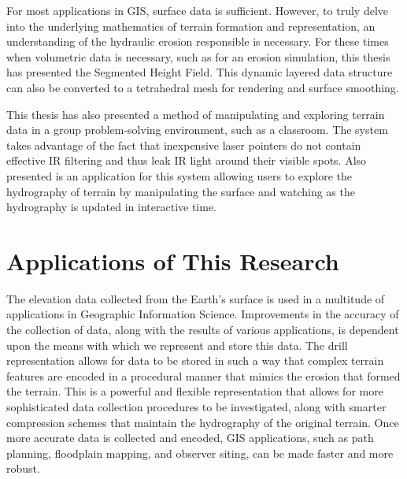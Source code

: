 For most applications in GIS, surface data is sufficient. However, to truly delve into the underlying mathematics of terrain formation and representation, an understanding of the hydraulic erosion responsible is necessary. For these times when volumetric data is necessary, such as for an erosion simulation, this thesis has presented the Segmented Height Field. This dynamic layered data structure can also be converted to a tetrahedral mesh for rendering and surface smoothing.

This thesis has also presented a method of manipulating and exploring terrain data in a group problem-solving environment, such as a classroom. The system takes advantage of the fact that inexpensive laser pointers do not contain effective IR filtering and thus leak IR light around their visible spots. Also presented is an application for this system allowing users to explore the hydrography of terrain by manipulating the surface and watching as the hydrography is updated in interactive time.


\section{Applications of This Research}
% 
% 


The elevation data collected from the Earth's surface is used in a multitude of applications in Geographic Information Science. Improvements in the accuracy of the collection of data, along with the results of various applications, is dependent upon the means with which we represent and store this data. The drill representation allows for data to be stored in such a way that complex terrain features are encoded in a procedural manner that mimics the erosion that formed the terrain. This is a powerful and flexible representation that allows for more sophisticated data collection procedures to be investigated, along with smarter compression schemes that maintain the hydrography of the original terrain. Once more accurate data is collected and encoded, GIS applications, such as path planning, floodplain mapping, and observer siting, can be made faster and more robust.

